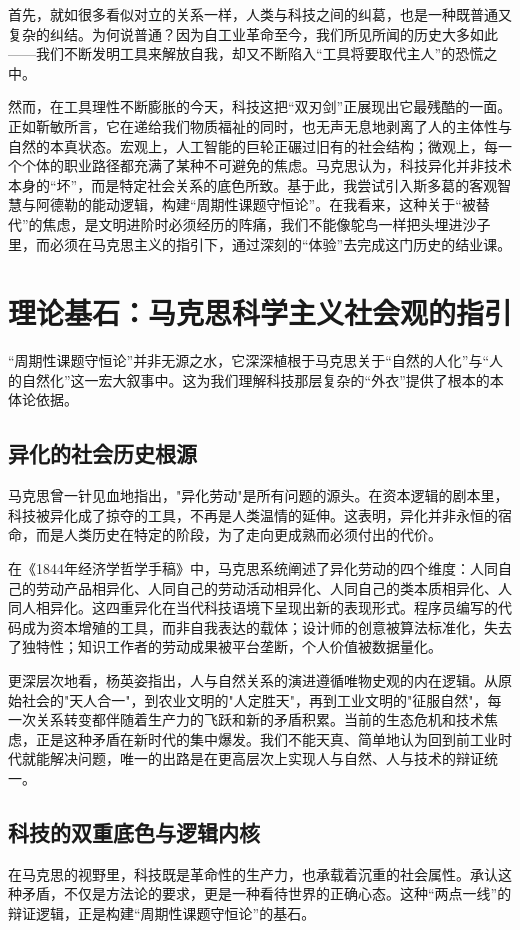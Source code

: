\documentclass[a4paper,12pt]{ctexart}
\begin{document}
首先，就如很多看似对立的关系一样，人类与科技之间的纠葛，也是一种既普通又复杂的纠结。为何说普通？因为自工业革命至今，我们所见所闻的历史大多如此——我们不断发明工具来解放自我，却又不断陷入“工具将要取代主人”的恐慌之中。


然而，在工具理性不断膨胀的今天，科技这把“双刃剑”正展现出它最残酷的一面。正如靳敏所言，它在递给我们物质福祉的同时，也无声无息地剥离了人的主体性与自然的本真状态。宏观上，人工智能的巨轮正碾过旧有的社会结构；微观上，每一个个体的职业路径都充满了某种不可避免的焦虑。马克思认为，科技异化并非技术本身的“坏”，而是特定社会关系的底色所致。基于此，我尝试引入斯多葛的客观智慧与阿德勒的能动逻辑，构建“周期性课题守恒论”。在我看来，这种关于“被替代”的焦虑，是文明进阶时必须经历的阵痛，我们不能像鸵鸟一样把头埋进沙子里，而必须在马克思主义的指引下，通过深刻的“体验”去完成这门历史的结业课。

\section{理论基石：马克思科学主义社会观的指引}

“周期性课题守恒论”并非无源之水，它深深植根于马克思关于“自然的人化”与“人的自然化”这一宏大叙事中。这为我们理解科技那层复杂的“外衣”提供了根本的本体论依据。

\subsection{异化的社会历史根源}
马克思曾一针见血地指出，"异化劳动"是所有问题的源头。在资本逻辑的剧本里，科技被异化成了掠夺的工具，不再是人类温情的延伸。这表明，异化并非永恒的宿命，而是人类历史在特定的阶段，为了走向更成熟而必须付出的代价。

在《1844年经济学哲学手稿》中，马克思系统阐述了异化劳动的四个维度：人同自己的劳动产品相异化、人同自己的劳动活动相异化、人同自己的类本质相异化、人同人相异化。这四重异化在当代科技语境下呈现出新的表现形式。程序员编写的代码成为资本增殖的工具，而非自我表达的载体；设计师的创意被算法标准化，失去了独特性；知识工作者的劳动成果被平台垄断，个人价值被数据量化。

更深层次地看，杨英姿指出，人与自然关系的演进遵循唯物史观的内在逻辑。从原始社会的"天人合一"，到农业文明的"人定胜天"，再到工业文明的"征服自然"，每一次关系转变都伴随着生产力的飞跃和新的矛盾积累。当前的生态危机和技术焦虑，正是这种矛盾在新时代的集中爆发。我们不能天真、简单地认为回到前工业时代就能解决问题，唯一的出路是在更高层次上实现人与自然、人与技术的辩证统一。

\subsection{科技的双重底色与逻辑内核}
在马克思的视野里，科技既是革命性的生产力，也承载着沉重的社会属性。承认这种矛盾，不仅是方法论的要求，更是一种看待世界的正确心态。这种“两点一线”的辩证逻辑，正是构建“周期性课题守恒论”的基石。
\end{document}
